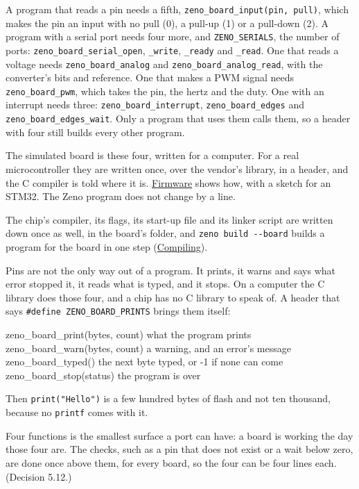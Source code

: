 A program that reads a pin needs a fifth,
\verb|zeno_board_input(pin, pull)|, which makes the pin an input with
no pull (0), a pull-up (1) or a pull-down (2). A program with a serial
port needs four more, and \verb|ZENO_SERIALS|, the number of ports:
\verb|zeno_board_serial_open|, \verb|_write|, \verb|_ready| and
\verb|_read|. One that reads a voltage needs
\verb|zeno_board_analog| and \verb|zeno_board_analog_read|, with the
converter's bits and reference. One that makes a PWM signal needs
\verb|zeno_board_pwm|, which takes the pin, the hertz and the duty.
One with an interrupt needs three: \verb|zeno_board_interrupt|,
\verb|zeno_board_edges| and \verb|zeno_board_edges_wait|. Only a program that uses them calls them, so a header
with four still builds every other program.

The simulated board is these four, written for a computer. For a real
microcontroller they are written once, over the vendor's library, in a
header, and the C compiler is told where it is.
\hyperref[ch-firmware]{Firmware} shows how, with a sketch for an
STM32. The Zeno program does not change by a line.

The chip's compiler, its flags, its start-up file and its linker
script are written down once as well, in the board's folder, and
\verb|zeno build --board| builds a program for the board in one step
(\hyperref[ch-compiling]{Compiling}).

Pins are not the only way out of a program. It prints, it warns and
says what error stopped it, it reads what is typed, and it stops. On
a computer the C library does those four, and a chip has no C library
to speak of. A header that says \verb|#define ZENO_BOARD_PRINTS|
brings them itself:

\begin{zenofrag}[lang=shell]
zeno_board_print(bytes, count)   what the program prints
zeno_board_warn(bytes, count)    a warning, and an error's message
zeno_board_typed()               the next byte typed, or -1 if none can come
zeno_board_stop(status)          the program is over
\end{zenofrag}

Then \verb|print("Hello")| is a few hundred bytes of flash and not ten
thousand, because no \verb|printf| comes with it.

\begin{why}
Four functions is the smallest surface a port can have: a board is
working the day those four are. The checks, such as a pin that does
not exist or a wait below zero, are done once above them, for every
board, so the four can be four lines each. (Decision 5.12.)
\end{why}

